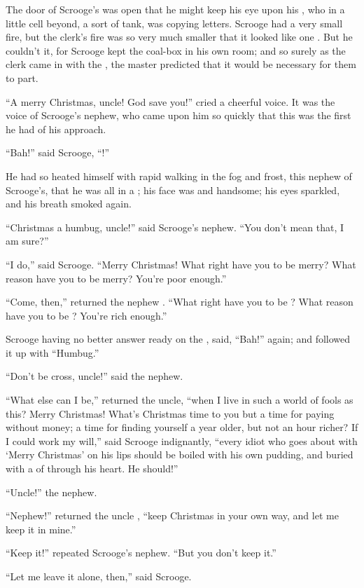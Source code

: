 \documentclass[troisieme]{fiche}
\begin{document}
\begin{texte}
The door of Scrooge's  was open
that he might keep his eye upon his , who in a
 little cell beyond, a sort of tank, was copying letters. Scrooge
had a very small fire, but the clerk's fire was so very much smaller that it looked like one
. But he couldn't  it, for
Scrooge kept the coal-box in his own room; and so surely as the clerk came in with the
, the master predicted that it would be necessary for them to
part.

``A merry Christmas, uncle! God save you!'' cried a cheerful voice. It was the voice of
Scrooge's nephew, who came upon him so quickly that this was the first
 he had of his approach.

``Bah!'' said Scrooge, ``!''

He had so heated himself with rapid walking in the fog and frost, this nephew of Scrooge's,
that he was all in a ; his face was
 and handsome; his eyes sparkled, and his breath smoked again.

``Christmas a humbug, uncle!'' said Scrooge's nephew. ``You don't mean that, I am sure?''

``I do,'' said Scrooge. ``Merry Christmas! What right have you to be merry? What reason have
you to be merry? You're poor enough.''

``Come, then,'' returned the nephew . ``What right have you to be
? What reason have you to be ? You're
rich enough.''

Scrooge having no better answer ready on the , said, ``Bah!'' again; and followed it up with ``Humbug.''

``Don't be cross, uncle!'' said the nephew.

``What else can I be,'' returned the uncle, ``when I live in such a world of fools as this?
Merry Christmas! What's Christmas time to you but a time for paying  without money; a time for finding yourself a year older, but not an hour richer? If
I could work my will,'' said Scrooge indignantly, ``every idiot who goes about with `Merry
Christmas' on his lips should be boiled with his own pudding, and buried with a
 of  through his heart. He should!''

``Uncle!''  the nephew.

``Nephew!'' returned the uncle , ``keep Christmas in your own
way, and let me keep it in mine.''

``Keep it!'' repeated Scrooge's nephew. ``But you don't keep it.''

``Let me leave it alone, then,'' said Scrooge.
\end{texte}
\end{document}
